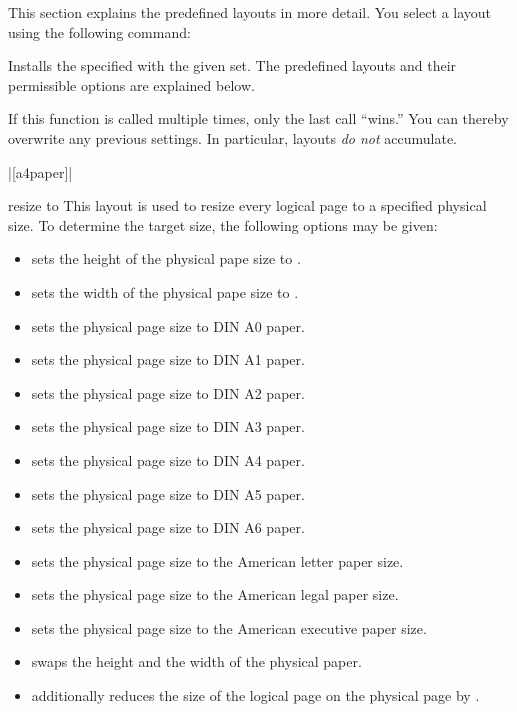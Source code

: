 This section explains the predefined layouts in more detail. You
select a layout using the following command:
\begin{command}{\pgfpagesuselayout{}}
  Installs the specified  with the given 
  set. The predefined layouts and their permissible options are
  explained below.

  If this function is called multiple times, only the last call
  ``wins.'' You can thereby overwrite any previous settings. In
  particular, layouts \emph{do not} accumulate.

  \example |[a4paper]|
\end{command}

\begin{pgflayout}{resize to}
  This layout is used to resize every logical page to a specified
  physical size. To determine the target size, the following options
  may be given:
  \begin{itemize}
  \item
     sets the
    height of the physical pape size to .
  \item
     sets the
    width of the physical pape size to .
  \item
     sets the physical page size to DIN A0 paper.
  \item
     sets the physical page size to DIN A1 paper.
  \item
     sets the physical page size to DIN A2 paper.
  \item
     sets the physical page size to DIN A3 paper.
  \item
     sets the physical page size to DIN A4 paper.
  \item
     sets the physical page size to DIN A5 paper.
  \item
     sets the physical page size to DIN A6 paper.
  \item
     sets the physical page size to the
    American letter paper size.
  \item
     sets the physical page size to the
    American legal paper size.
  \item
     sets the physical page size to the
    American executive paper size.
  \item
     swaps the height and the width of the
    physical paper.
  \item
     additionally reduces the
    size of the logical page on the physical page by .
  \end{itemize}
\end{pgflayout}

